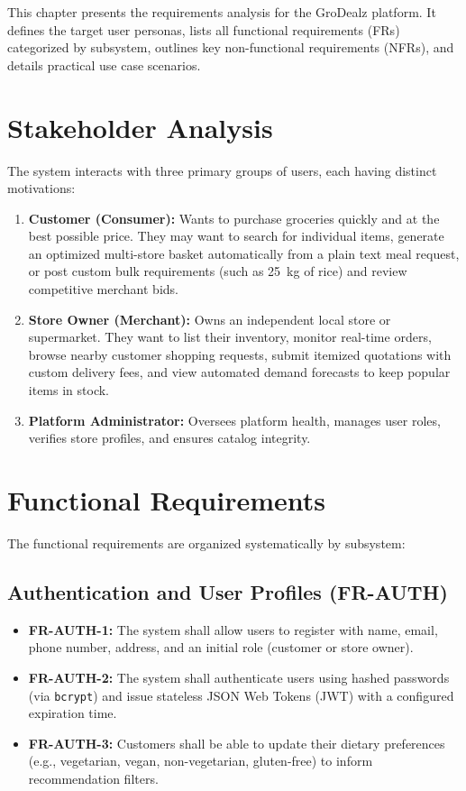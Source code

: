 
This chapter presents the requirements analysis for the GroDealz platform. It defines the target user personas, lists all functional requirements (FRs) categorized by subsystem, outlines key non-functional requirements (NFRs), and details practical use case scenarios.

\section{Stakeholder Analysis}

The system interacts with three primary groups of users, each having distinct motivations:

\begin{enumerate}
    \item \textbf{Customer (Consumer):} Wants to purchase groceries quickly and at the best possible price. They may want to search for individual items, generate an optimized multi-store basket automatically from a plain text meal request, or post custom bulk requirements (such as 25~kg of rice) and review competitive merchant bids.
    \item \textbf{Store Owner (Merchant):} Owns an independent local store or supermarket. They want to list their inventory, monitor real-time orders, browse nearby customer shopping requests, submit itemized quotations with custom delivery fees, and view automated demand forecasts to keep popular items in stock.
    \item \textbf{Platform Administrator:} Oversees platform health, manages user roles, verifies store profiles, and ensures catalog integrity.
\end{enumerate}

\section{Functional Requirements}

The functional requirements are organized systematically by subsystem:

\subsection{Authentication and User Profiles (FR-AUTH)}
\begin{itemize}
    \item \textbf{FR-AUTH-1:} The system shall allow users to register with name, email, phone number, address, and an initial role (customer or store owner).
    \item \textbf{FR-AUTH-2:} The system shall authenticate users using hashed passwords (via \texttt{bcrypt}) and issue stateless JSON Web Tokens (JWT) with a configured expiration time.
    \item \textbf{FR-AUTH-3:} Customers shall be able to update their dietary preferences (e.g., vegetarian, vegan, non-vegetarian, gluten-free) to inform recommendation filters.
\end{itemize}

